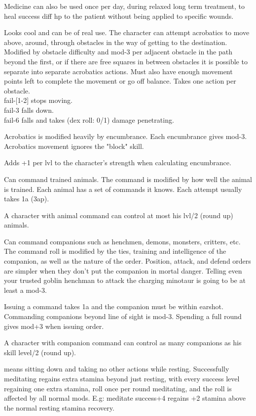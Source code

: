 Medicine can also be used once per day, during relaxed long term treatment, to heal success diff hp to the patient without being applied to specific wounds.


 Looks cool and can be of real use. The character can attempt acrobatics to move above, around, through obstacles in the way of getting to the destination. Modified by obstacle difficulty and mod-3 per adjacent obstacle in the path beyond the first, or if there are free squares in between obstacles it is possible to separate into separate acrobatics actions. Must also have enough movement points left to complete the movement or go off balance. Takes one action per obstacle. \\
fail-[1-2] stops moving. \\
fail-3 falls down. \\
fail-6 falls and takes (dex roll: 0/1) damage penetrating.

Acrobatics is modified heavily by encumbrance. Each encumbrance gives mod-3.
Acrobatics movement ignores the "block" skill.


 Adds +1 per lvl to the character's strength when calculating encumbrance.


 Can command trained animals. The command is modified by how well the animal is trained. Each animal has a set of commands it knows. Each attempt usually takes 1a (3ap).

A character with animal command can control at most his lvl/2 (round up) animals.


 Can command companions such as henchmen, demons, monsters, critters, etc. The command roll is modified by the ties, training and intelligence of the companion, as well as the nature of the order. Position, attack, and defend orders are simpler when they don't put the companion in mortal danger. Telling even your trusted goblin henchman to attack the charging minotaur is going to be at least a mod-3.

Issuing a command takes 1a and the companion must be within earshot. Commanding companions beyond line of sight is mod-3. Spending a full round gives mod+3 when issuing order.

A character with companion command can control as many companions as his skill level/2 (round up).


 means sitting down and taking no other actions while resting. Successfully meditating regains extra stamina beyond just resting, with every success level regaining one extra stamina, roll once per round meditating, and the roll is affected by all normal mods. E.g: meditate success+4 regains +2 stamina above the normal resting stamina recovery.

